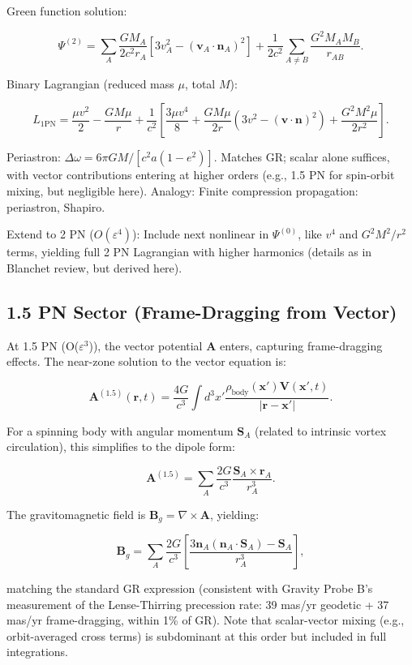 \documentclass{article}
\begin{document}
Green function solution:

\[
\Psi^{(2)} = \sum_A \frac{GM_A}{2 c^2 r_A} [3 v_A^2 - (\mathbf{v}_A \cdot \mathbf{n}_A)^2] + \frac{1}{2 c^2} \sum_{A \neq B} \frac{G^2 M_A M_B}{ r_{AB}}.
\]

Binary Lagrangian (reduced mass $\mu$, total $M$):

\[
L_{1\text{PN}} = \frac{\mu v^2}{2} - \frac{GM \mu}{r} + \frac{1}{c^2} \left[ \frac{3\mu v^4}{8} + \frac{GM \mu}{2 r} (3 v^2 - (\mathbf{v} \cdot \mathbf{n})^2) + \frac{G^2 M^2 \mu}{2 r^2} \right].
\]

Periastron: $\Delta \omega = 6\pi GM / [c^2 a (1-e^2)]$. Matches GR; scalar alone suffices, with vector contributions entering at higher orders (e.g., 1.5 PN for spin-orbit mixing, but negligible here). Analogy: Finite compression propagation: periastron, Shapiro.

Extend to 2 PN ($O(\varepsilon^4)$): Include next nonlinear in $\Psi^{(0)}$, like $v^4$ and $G^2 M^2 / r^2$ terms, yielding full 2 PN Lagrangian with higher harmonics (details as in Blanchet review, but derived here).

\subsection{1.5 PN Sector (Frame-Dragging from Vector)}

At 1.5 PN (O($\varepsilon^3$)), the vector potential $\mathbf{A}$ enters, capturing frame-dragging effects. The near-zone solution to the vector equation is:

\[
\mathbf{A}^{(1.5)}(\mathbf{r}, t) = \frac{4 G}{c^3} \int d^3 x' \frac{\rho_{\text{body}}(\mathbf{x}') \mathbf{V}(\mathbf{x}', t)}{|\mathbf{r} - \mathbf{x}'|}.
\]

For a spinning body with angular momentum $\mathbf{S}_A$ (related to intrinsic vortex circulation), this simplifies to the dipole form:

\[
\mathbf{A}^{(1.5)} = \sum_A \frac{2 G}{c^3} \frac{\mathbf{S}_A \times \mathbf{r}_A}{r_A^3}.
\]

The gravitomagnetic field is $\mathbf{B}_g = \nabla \times \mathbf{A}$, yielding:

\[
\mathbf{B}_g = \sum_A \frac{2 G}{c^3} \left[ \frac{3 \mathbf{n}_A (\mathbf{n}_A \cdot \mathbf{S}_A) - \mathbf{S}_A}{r_A^3} \right],
\]

matching the standard GR expression (consistent with Gravity Probe B's measurement of the Lense-Thirring precession rate: 39 mas/yr geodetic + 37 mas/yr frame-dragging, within 1\% of GR). Note that scalar-vector mixing (e.g., orbit-averaged cross terms) is subdominant at this order but included in full integrations.
\end{document}
